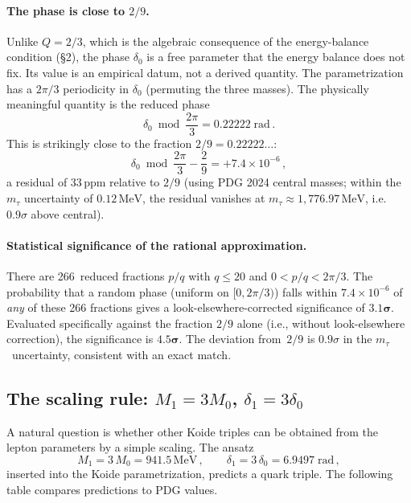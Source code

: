 \documentclass[12pt,a4paper]{article}
\newcommand{\MeV}{\,\text{MeV}}
\begin{document}
\paragraph{The phase is close to $2/9$.}
Unlike $Q = 2/3$, which is the algebraic consequence of the
energy-balance condition (\S2), the phase
$\delta_0$ is a free parameter that the energy balance does
not fix. Its value is an empirical datum, not a derived quantity.
The parametrization has a $2\pi/3$ periodicity
in $\delta_0$ (permuting the three masses). The physically
meaningful quantity is the reduced phase
\begin{equation}
\delta_0 \bmod \frac{2\pi}{3} = 0.22222\;\text{rad}\,.
\end{equation}
This is strikingly close to the fraction $2/9 = 0.22222\ldots$:
\begin{equation}
\delta_0 \bmod \frac{2\pi}{3} - \frac{2}{9} = +7.4 \times 10^{-6}\,,
\end{equation}
a residual of $33\,\text{ppm}$ relative to $2/9$
(using PDG 2024 central masses; within the $m_\tau$ uncertainty
of $0.12\MeV$, the residual vanishes at $m_\tau \approx 1{,}776.97\MeV$,
i.e.\ $0.9\sigma$ above central).

\paragraph{Statistical significance of the rational approximation.}
There are 266~reduced fractions $p/q$ with $q \leq 20$ and
$0 < p/q < 2\pi/3$. The probability that a random phase (uniform
on $[0, 2\pi/3)$) falls within $7.4 \times 10^{-6}$ of \emph{any}
of these 266 fractions gives a look-elsewhere-corrected significance
of $\mathbf{3.1\sigma}$. Evaluated specifically against the fraction
$2/9$ alone (i.e., without look-elsewhere correction), the
significance is $\mathbf{4.5\sigma}$.
The deviation from~$2/9$ is $0.9\sigma$ in the
$m_\tau$~uncertainty, consistent with an exact match.

\subsection{The scaling rule: $M_1 = 3M_0$, $\delta_1 = 3\delta_0$}

A natural question is whether other Koide triples can be obtained
from the lepton parameters by a simple scaling. The ansatz
\begin{equation}
M_1 = 3\,M_0 = 941.5\MeV\,, \qquad
\delta_1 = 3\,\delta_0 = 6.9497\;\text{rad}\,,
\end{equation}
inserted into the Koide parametrization, predicts a quark triple.
The following table compares predictions to PDG values.
\end{document}
